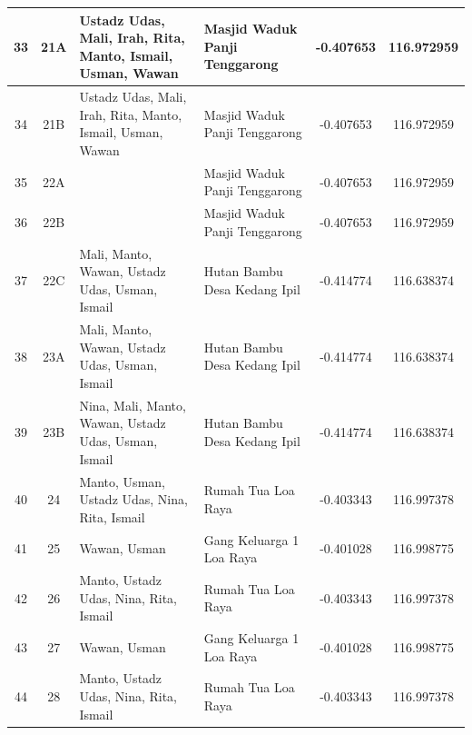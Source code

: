 \begin{landscape}
{\begin{tabularx}{\textwidth}{|c|c|l|l|c|c|}
            33 & 21A            & Ustadz Udas, Mali, Irah, Rita, Manto,   Ismail, Usman, Wawan & Masjid Waduk Panji Tenggarong      & -0.407653         & 116.972959         \\ \hline
            34 & 21B            & Ustadz Udas, Mali, Irah, Rita, Manto,   Ismail, Usman, Wawan & Masjid Waduk Panji Tenggarong      & -0.407653         & 116.972959         \\ \hline
            35 & 22A            &                                                              & Masjid Waduk Panji Tenggarong      & -0.407653         & 116.972959         \\ \hline
            36 & 22B            &                                                              & Masjid Waduk Panji Tenggarong      & -0.407653         & 116.972959         \\ \hline
            37 & 22C            & Mali, Manto, Wawan, Ustadz Udas, Usman,   Ismail             & Hutan Bambu Desa Kedang Ipil       & -0.414774         & 116.638374         \\ \hline
            38 & 23A            & Mali, Manto, Wawan, Ustadz Udas, Usman,   Ismail             & Hutan Bambu Desa Kedang Ipil       & -0.414774         & 116.638374         \\ \hline
            39 & 23B            & Nina, Mali, Manto, Wawan, Ustadz Udas,   Usman, Ismail       & Hutan Bambu Desa Kedang Ipil       & -0.414774         & 116.638374         \\ \hline
            40 & 24             & Manto, Usman, Ustadz Udas, Nina, Rita,   Ismail              & Rumah Tua Loa Raya                 & -0.403343         & 116.997378         \\ \hline
            41 & 25             & Wawan, Usman                                                 & Gang Keluarga 1 Loa Raya           & -0.401028         & 116.998775         \\ \hline
            42 & 26             & Manto, Ustadz Udas, Nina, Rita, Ismail                       & Rumah Tua Loa Raya                 & -0.403343         & 116.997378         \\ \hline
            43 & 27             & Wawan, Usman                                                 & Gang Keluarga 1 Loa Raya           & -0.401028         & 116.998775         \\ \hline
            44 & 28             & Manto, Ustadz Udas, Nina, Rita, Ismail                       & Rumah Tua Loa Raya                 & -0.403343         & 116.997378         \\ \hline

\end{tabularx}}
\end{landscape}

